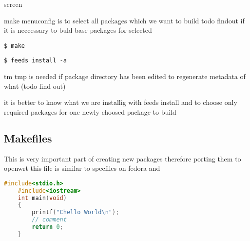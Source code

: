 screen

make menuconfig is to select all packages which we want to build  todo findout if it is neccessary to buld base packages for selected

{\tt \$ make}

{\tt \$ feeds install -a}

tm tmp is needed if package directory has been edited to regenerate metadata of what (todo find out)

it is better to know what we are installig with feeds install and to choose only required packages for one newly choosed package to build

\subsection{Makefiles}

This is very important part of creating new packages therefore porting them to openwrt this file is similar to specfiles on fedora and

\begin{lstlisting}[language=c,basicstyle=\ttfamily\footnotesize,label=c,caption=Basic C code.]
    #include<stdio.h>
    #include<iostream>
    int main(void)
    {
        printf("Chello World\n");
        // comment
        return 0;
    }
\end{lstlisting}
